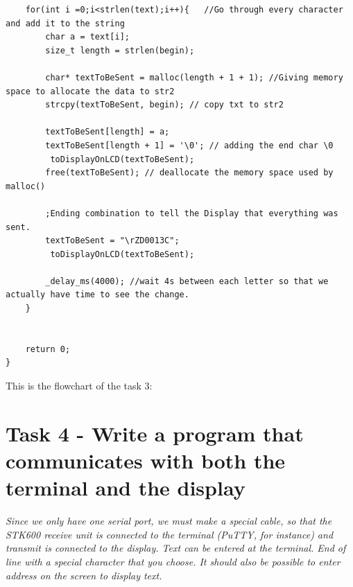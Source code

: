 \documentclass[a4paper,12pt]{article}
\begin{document}
\begin{lstlisting}
	for(int i =0;i<strlen(text);i++){ 	//Go through every character and add it to the string 
		char a = text[i];
		size_t length = strlen(begin);
		
		char* textToBeSent = malloc(length + 1 + 1); //Giving memory space to allocate the data to str2
		strcpy(textToBeSent, begin); // copy txt to str2
		
		textToBeSent[length] = a;  
		textToBeSent[length + 1] = '\0'; // adding the end char \0
		 toDisplayOnLCD(textToBeSent); 
		free(textToBeSent); // deallocate the memory space used by malloc()
		
		;Ending combination to tell the Display that everything was sent.
		textToBeSent = "\rZD0013C";
		 toDisplayOnLCD(textToBeSent);

		_delay_ms(4000); //wait 4s between each letter so that we actually have time to see the change.
	}

	
	return 0;
}
\end{lstlisting}
This is the flowchart of the task 3:
\begin{center}
\end{center}
\newpage
\section{Task 4 - Write a program that communicates with both the terminal and the display}
\textit{Since we only have one serial port, we must make a special cable, so that the STK600 receive unit
is connected to the terminal (PuTTY, for instance) and transmit is connected to the display. Text
can be entered at the terminal. End of line with a special character that you choose. It should also
be possible to enter address on the screen to display text.}
\end{document}

